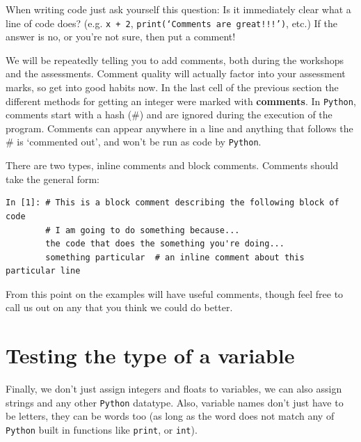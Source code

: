 When writing code just ask yourself this question: Is it immediately clear what a line of code does? (e.g. \texttt{x + 2}, \texttt{print(`Comments are great!!!')}, etc.) If the answer is no, or you're not sure, then put a comment! 

We will be repeatedly telling you to add comments, both during the workshops and the assessments. Comment quality will actually factor into your assessment marks, so get into good habits now. In the last cell of the previous section the different methods for getting an integer were marked with \textbf{comments}. In \texttt{Python}, comments start with a hash (\#)  and are ignored during the execution of the program. Comments can appear anywhere in a line and anything that follows the \# is `commented out', and won't be run as code by \texttt{Python}. 

There are two types, inline comments and block comments. Comments should take the general form:
\begin{lstlisting}[style=PY]
In [1]: # This is a block comment describing the following block of code
        # I am going to do something because... 
        the code that does the something you're doing...
        something particular  # an inline comment about this particular line
\end{lstlisting}

From this point on the examples will have useful comments, though feel free to call us out on any that you think we could do better.

\section{Testing the type of a variable}
\label{variabletype}

Finally, we don't just assign integers and floats to variables, we can also assign strings and any other \texttt{Python} datatype. Also, variable names don't just have to be letters, they can be words too (as long as the word does not match any of \texttt{Python} built in functions like \texttt{print}, or \texttt{int}).

